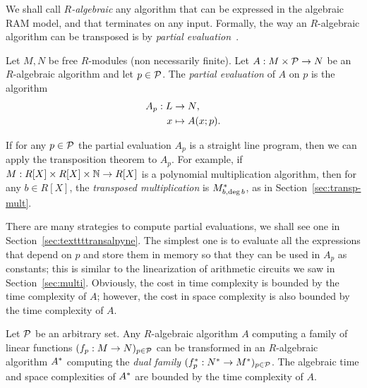 We shall call \emph{$R$-algebraic} any
algorithm that can be expressed in the algebraic RAM model, and that
terminates on any input. Formally, the way an $R$-algebraic algorithm
can be transposed is by \emph{partial
  evaluation}~\cite{consel+danvy93,riazanov+voronkov04,carette+kiselyov+shan09:jfp}.

\begin{definition}
  Let $M,N$ be free $R$-modules (non necessarily finite). Let
  $A:M\times\mathcal{P}\rightarrow N$ be an $R$-algebraic algorithm and let $p\in
  \mathcal{P}$. The \emph{partial evaluation} of
  $A$ on $p$ is the algorithm
  \begin{equation}
    \label{eq:274}
    \begin{aligned}
      A_{p}:L&\rightarrow N\text{,}\\
      x &\mapsto A(x;p)
      \text{.}
    \end{aligned}
  \end{equation}
\end{definition}

If for any $p\in\mathcal{P}$ the partial evaluation $A_{p}$ is
a straight line program, then we can apply the transposition theorem
to $A_{p}$. For example, if $M:R[X]\times R[X]\times \mathbb{N}\rightarrow R[X]$ is
a polynomial multiplication algorithm, then for any $b\in R[X]$, the
\emph{transposed multiplication} is $M_{b,\deg b}^\ast$, as in
Section~\ref{sec:transp-mult}.

There are many strategies to compute partial evaluations, we shall see
one in Section~\ref{sec:texttttransalpyne}. The simplest one is to
evaluate all the expressions that depend on $p$ and store them in
memory so that they can be used in $A_p$ as constants; this is similar
to the linearization of arithmetic circuits we saw in
Section~\ref{sec:multi}. Obviously, the cost in time complexity is
bounded by the time complexity of $A$; however, the cost in space
complexity is also bounded by the time complexity of $A$.

\begin{principle}
  \label{th:tellegen-princip}
  Let $\mathcal{P}$ be an arbitrary set. Any $R$-algebraic algorithm $A$
  computing a family of linear functions $(f_p:M\rightarrow N)_{p\in\mathcal{P}}$
  can be transformed in an $R$-algebraic algorithm $A^\ast$
  computing the \emph{dual family}
  $(f^\ast_p:N^\ast\rightarrow M^\ast)_{p\in\mathcal{P}}$. The algebraic time
  and space complexities of $A^\ast$ are bounded by the time
  complexity of $A$.
\end{principle}

